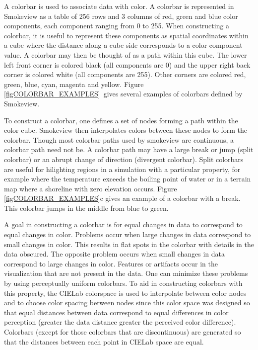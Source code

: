 \documentclass[11pt,twoside]{book}
\begin{document}
A colorbar is used to associate
data with color.  A colorbar is represented in Smokeview as a table of 256 rows and 3 columns
of red, green and blue color components, each component ranging from 0 to 255.
When constructing a colorbar, it is useful to represent these components as spatial coordinates within a cube
where the distance along a cube side corresponds to a color component value.  A colorbar
may then be thought of as a path within this cube.
The lower left front corner
is colored black (all components are 0) and the upper right back corner is colored
white (all components are 255).  Other corners are colored red, green, blue, cyan, magenta and
yellow.
Figure \ref{figCOLORBAR_EXAMPLES}\ gives several examples of colorbars defined
by Smokeview.

To construct a colorbar, one defines a set of nodes forming a path
within the color cube.  Smokeview then interpolates colors between these nodes
to form the colorbar.  Though most colorbar paths used by smokeview are continuous, a colorbar
path need not be.  A colorbar path may have a large break or jump (split colorbar)
or an abrupt change of direction (divergent colorbar).  Split colorbars
are useful for hilighting regions in a simulation with a particular
property, for example where the temperature exceeds the boiling point of
water or in a terrain map where a shoreline with zero elevation occurs.
Figure \ref{figCOLORBAR_EXAMPLES}c
gives an example of a colorbar with a break.  This colorbar jumps in the
middle from  blue to  green.

A goal in constructing a colorbar is for equal changes in data to correspond to
equal changes in color. Problems occur when large changes in data correspond
to small changes in color. This results in flat spots in the colorbar with details in the data  obscured.
The opposite problem occurs when small changes in data correspond to large changes in color.
Features or artifacts occur in the visualization that are not present in the data.
One can minimize these problems by using perceptually uniform colorbars\cite{kovesi2015good}.
To aid in constructing colorbars with this property, the CIELab colorspace is used to interpolate
between color nodes and to choose color spacing between nodes
since this color space was designed so that equal distances between data correspond to equal differences in color perception (greater the data distance greater the perceived color difference).
Colorbars (except for those colorbars that are discontinuous)
are generated so that the distances between each point in CIELab space are equal.
\end{document}
